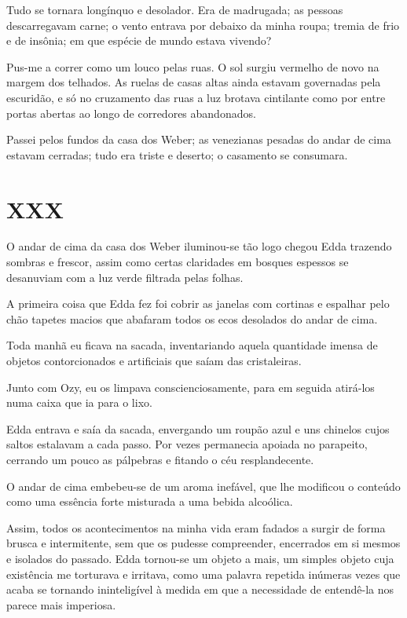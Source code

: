 Tudo se tornara longínquo e desolador. Era de madrugada; as pessoas descarregavam carne; o vento entrava por debaixo da minha roupa; tremia de frio e de insônia; em que espécie de mundo estava vivendo? 

Pus-me a correr como um louco pelas ruas. O sol surgiu vermelho de novo na margem dos telhados. As ruelas de casas altas ainda estavam governadas pela escuridão, e só no cruzamento das ruas a luz brotava cintilante como por entre portas abertas ao longo de corredores abandonados.

Passei pelos fundos da casa dos Weber; as venezianas pesadas do andar de cima estavam cerradas; tudo era triste e deserto; o casamento se consumara.


\chapter*{\centering\Large{XXX}}

O andar de cima da casa dos Weber iluminou-se tão logo chegou Edda trazendo sombras e frescor, assim como certas claridades em bosques espessos se desanuviam com a luz verde filtrada pelas folhas.

A primeira coisa que Edda fez foi cobrir as janelas com cortinas e espalhar pelo chão tapetes macios que abafaram todos os ecos desolados do andar de cima.

Toda manhã eu ficava na sacada, inventariando aquela quantidade imensa de objetos contorcionados e artificiais que saíam das cristaleiras.

Junto com Ozy, eu os limpava conscienciosamente, para em seguida atirá-los numa caixa que ia para o lixo.

Edda entrava e saía da sacada, envergando um roupão azul e uns chinelos cujos saltos estalavam a cada passo. Por vezes permanecia apoiada no parapeito, cerrando um pouco as pálpebras e fitando o céu resplandecente.

O andar de cima embebeu-se de um aroma inefável, que lhe modificou o conteúdo como uma essência forte misturada a uma bebida alcoólica.

Assim, todos os acontecimentos na minha vida eram fadados a surgir de forma brusca e intermitente, sem que os pudesse compreender, encerrados em si mesmos e isolados do passado. Edda tornou-se um objeto a mais, um simples objeto cuja existência me torturava e irritava, como uma palavra repetida inúmeras vezes que acaba se tornando ininteligível à medida em que a necessidade de entendê-la nos parece mais imperiosa.

